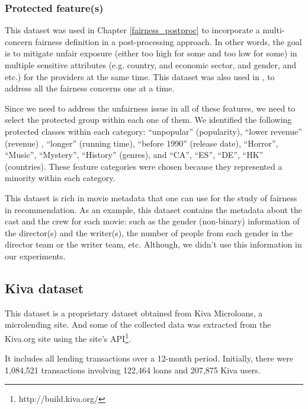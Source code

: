         \subsubsection{Protected feature(s)}

        This dataset was used in Chapter \ref{fairness_postproc}  to incorporate a multi-concern fairness definition in a post-processing approach. In other words, the goal is to mitigate unfair exposure (either too high for some and too low for some) in multiple sensitive attributes (e.g. country, and economic sector, and gender, and etc.) for the providers at the same time. This dataset was also used in , to address all the fairness concerns one at a time.
    
        Since we need to address the unfairness issue in all of these features, we need to select the protected group within each one of them.
        We identified the following protected classes within each category: ``unpopular'' (popularity), ``lower revenue'' (revenue) , ``longer'' (running time), ``before 1990'' (release date), ``Horror'', ``Music'', ``Mystery'', ``History'' (genres), and ``CA'', ``ES'', ``DE'', ``HK'' (countries). These feature categories were chosen because they represented a minority within each category.
    
        This dataset is rich in movie metadata that one can use for the study of fairness in recommendation. As an example, this dataset contains the metadata about the cast and the crew for each movie: such as the gender (non-binary) information of the director(s) and the writer(s), the number of people from each gender in the director team or the writer team, etc. Although, we didn't use this information in our experiments.

    \subsection{Kiva dataset}
    This dataset is a proprietary dataset obtained from Kiva Microloans, a microlending site. And some of the collected data was extracted from the Kiva.org site using the site's API\footnote{http://build.kiva.org/}.
    
    It includes all lending transactions over a 12-month period. Initially, there were 1,084,521 transactions involving 122,464 loans and 207,875 Kiva users.
    
